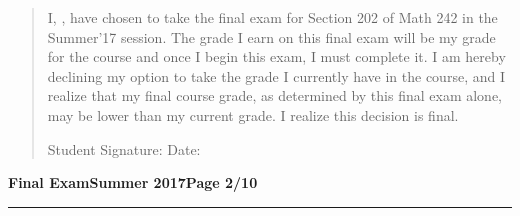 \documentclass[12pt]{article}
\theoremstyle{definition}
\begin{document}
\vspace{0.6cm}

\begin{quotation}
\noindent I, \makebox[8cm]{\hrulefill}, have chosen to take the final exam for Section 202 of Math 242 in the Summer'17 session.  The grade I earn on this final exam will be my grade for the course and once I begin this exam, I must complete it.  I am hereby declining my option to take the grade I currently have in the course, and I realize that my final course grade, as determined by this final exam alone, may be lower than my current grade.  I realize this decision is final.

\vspace{1cm}

\noindent Student Signature: \makebox[8cm]{\hrulefill} Date: \makebox[3cm]{\hrulefill}


\end{quotation}
\newpage

\hfill{\large\bf Final Exam}\hfill{\large\bf Summer 2017}\hfill{\large\bf Page 2/10}\hrule
\end{document}
